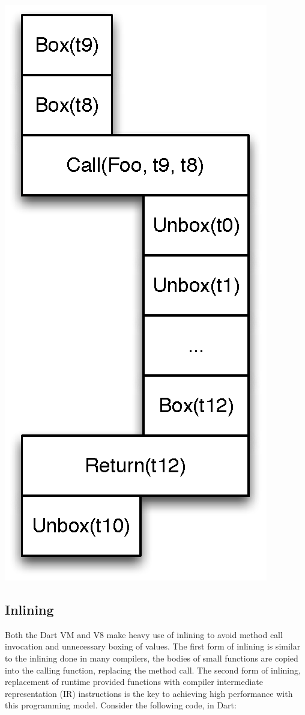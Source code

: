 \documentclass[preprint]{sigplanconf}
\begin{document}
\includegraphics{boxunboxbox.eps}

\subsection{Inlining}
\label{inlining}
Both the Dart VM and V8 make heavy use of inlining to avoid method call invocation and unnecessary boxing of values. The first form of inlining is similar to the inlining done in many compilers, the bodies of small functions are copied into the calling function, replacing the method call. The second form of inlining, replacement of runtime provided functions with compiler intermediate representation (IR) instructions is the key to achieving high performance with this programming model. Consider the following code, in Dart:
\end{document}
